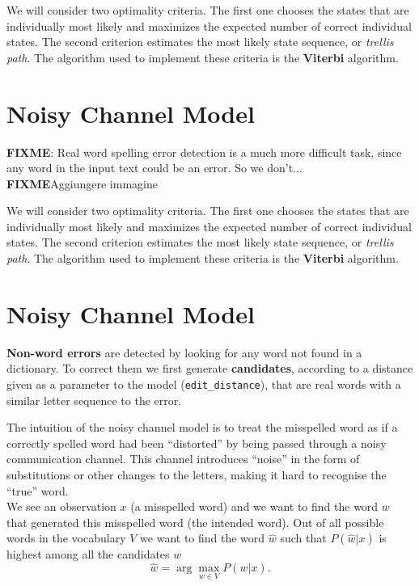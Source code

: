 We will consider two optimality criteria. The first one chooses the states that are individually most likely and maximizes the 
expected number of correct individual states. The second criterion estimates the most likely state sequence, or 
\textit{trellis path}. The algorithm used to implement these criteria is the \textbf{Viterbi} algorithm. %

\section{Noisy Channel Model}

\textbf{FIXME}: Real word spelling error detection is a much more difficult task, since any word in the input text could be 
an error. So we don’t...\\
\textbf{FIXME}{Aggiungere immagine }


We will consider two optimality criteria. The first one chooses the states that are individually most likely and maximizes the 
expected number of correct individual states. The second criterion estimates the most likely state sequence, or 
\textit{trellis path}. The algorithm used to implement these criteria is the \textbf{Viterbi} algorithm. %

\section{Noisy Channel Model}
\textbf{Non-word errors} are detected by looking for any word not found in a dictionary. To correct them we first 
generate \textbf{candidates}, according to a distance given as a parameter to the model (\texttt{edit\_distance}), 
that are 
real words with a similar letter sequence to the error. 

The intuition of the noisy channel model is to treat the misspelled word as if a correctly spelled word had 
been “distorted” by being passed through a noisy communication channel. 
This channel introduces “noise” in the form of substitutions or other changes to the letters, making it hard to 
recognise 
the “true” word. \\

We see an observation $x$ (a misspelled word) and we want to find the word $w$ that generated this misspelled 
word 
(the intended word).
Out of all possible words in the vocabulary $V$ we want to find the word $\hat{w}$ such that $P(\hat{w}|x)$ is 
highest 
among all the candidates $w$
\begin{equation}\label{eq:4.1}
	\hat{w} = \arg\max_{w \in V} P(w|x) \mbox{.}
\end{equation}

